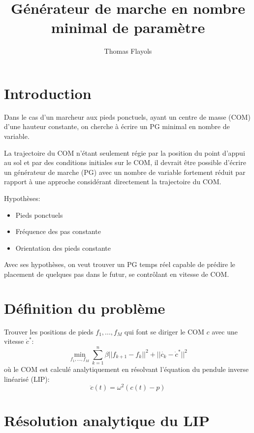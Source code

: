 \documentclass[10pt,a4paper]{article}
\begin{document}
\title{Générateur de marche en nombre minimal de paramètre}
\author{Thomas Flayols}
\maketitle
\section*{Introduction}
Dans le cas d'un marcheur aux pieds ponctuels, ayant un centre de masse (COM) d'une hauteur constante, on cherche à écrire un PG minimal en nombre de variable.

La  trajectoire du COM n'étant seulement régie par la position du point d’appui au sol et par des conditions initiales sur le COM, il devrait être possible d'écrire un générateur de marche (PG) avec un nombre de variable fortement réduit par rapport à une approche considérant directement la trajectoire du COM.

Hypothèses:
\begin{itemize}
\item Pieds ponctuels
\item Fréquence des pas constante
\item Orientation des pieds constante
\end{itemize}

Avec ses hypothèses, on veut trouver un PG temps réel capable de prédire le placement de quelques pas dans le futur, se contrôlant en vitesse de COM.
\section{Définition du problème}

Trouver les positions de pieds $f_1,...,f_M$ qui font se diriger le COM $c$ avec une vitesse $\dot{c}^*$:
\begin{equation}\label{problem}
\min_{ f_1,...,f_M} \sum\limits_{k=1}^n \beta||f_{k+1}-f_{k}||^2 + ||\dot{c_k}-\dot{c}^*||^2
\end{equation}
où le COM est calculé analytiquement en résolvant l'équation du pendule inverse linéarisé (LIP):
\begin{equation}\label{lip}
\ddot{c}(t)=\omega^2 (c(t)-p)
\end{equation}

\section{Résolution analytique du LIP}
\end{document}
